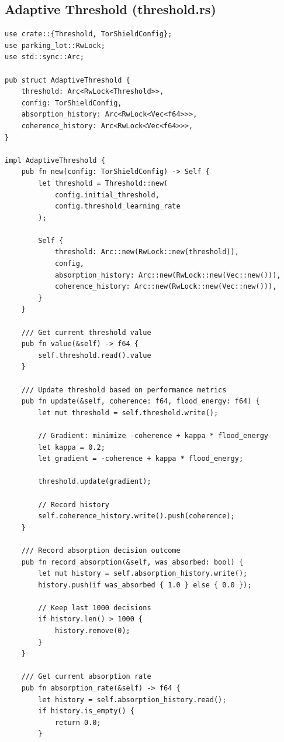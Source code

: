 \documentclass[11pt,a4paper]{article}
\begin{document}
\subsection{Adaptive Threshold (threshold.rs)}

\begin{lstlisting}[style=rust]
use crate::{Threshold, TorShieldConfig};
use parking_lot::RwLock;
use std::sync::Arc;

pub struct AdaptiveThreshold {
    threshold: Arc<RwLock<Threshold>>,
    config: TorShieldConfig,
    absorption_history: Arc<RwLock<Vec<f64>>>,
    coherence_history: Arc<RwLock<Vec<f64>>>,
}

impl AdaptiveThreshold {
    pub fn new(config: TorShieldConfig) -> Self {
        let threshold = Threshold::new(
            config.initial_threshold, 
            config.threshold_learning_rate
        );
        
        Self {
            threshold: Arc::new(RwLock::new(threshold)),
            config,
            absorption_history: Arc::new(RwLock::new(Vec::new())),
            coherence_history: Arc::new(RwLock::new(Vec::new())),
        }
    }
    
    /// Get current threshold value
    pub fn value(&self) -> f64 {
        self.threshold.read().value
    }
    
    /// Update threshold based on performance metrics
    pub fn update(&self, coherence: f64, flood_energy: f64) {
        let mut threshold = self.threshold.write();
        
        // Gradient: minimize -coherence + kappa * flood_energy
        let kappa = 0.2;
        let gradient = -coherence + kappa * flood_energy;
        
        threshold.update(gradient);
        
        // Record history
        self.coherence_history.write().push(coherence);
    }
    
    /// Record absorption decision outcome
    pub fn record_absorption(&self, was_absorbed: bool) {
        let mut history = self.absorption_history.write();
        history.push(if was_absorbed { 1.0 } else { 0.0 });
        
        // Keep last 1000 decisions
        if history.len() > 1000 {
            history.remove(0);
        }
    }
    
    /// Get current absorption rate
    pub fn absorption_rate(&self) -> f64 {
        let history = self.absorption_history.read();
        if history.is_empty() {
            return 0.0;
        }
        

\end{lstlisting}
\end{document}
